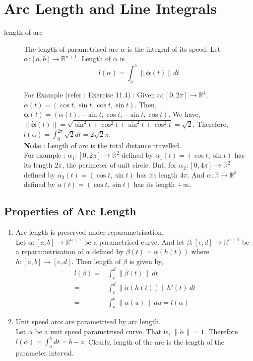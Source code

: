 \section{Arc Length and Line Integrals}
\begin{description}
	\item[length of arc] The length of parametrised arc $\alpha$ is the integral of its speed. Let $\alpha : [a,b] \to \mathbb{R}^{n+1}$. Length of $\alpha$ is
	\begin{equation}
		l(\alpha) = \int_a^b \| \dot{\boldsymbol{\alpha}}(t) \| dt
	\end{equation}

	For Example (refer : Exercise 11.4) : Given $\alpha: [0,2\pi] \to \mathbb{R}^4$, $\alpha(t) = (\cos t,\sin t, \cos t,\sin t)$. Then, $\dot{\boldsymbol{\alpha}}(t) = (\alpha(t),-\sin t,\cos t,-\sin t,\cos t)$. We have, $\| \dot{\boldsymbol{\alpha}}(t) \| = \sqrt{\sin^2 t+\cos^2 t+\sin^2 t+ \cos^2 t} = \sqrt{2}$. Therefore, $l(\alpha) = \int_0^{2\pi} \sqrt{2}dt = 2\sqrt{2}\pi$.\\

	\textbf{Note} : Length of arc is the total distance travelled.\\
	For example : $\alpha_1 : [0,2\pi] \to \mathbb{R}^2$ defined by $\alpha_1(t) = (\cos t,\sin t)$ has its length $2\pi$, the perimeter of unit circle. But, for $\alpha_2 : [0,4\pi] \to \mathbb{R}^2$ defined by $\alpha_2(t) = (\cos t,\sin t)$ has its length $4\pi$. And $\alpha : \mathbb{R} \to \mathbb{R}^2$ defined by $\alpha(t) = (\cos t,\sin t)$ has its length $+\infty$.
\end{description}

\subsection{Properties of Arc Length}
\begin{enumerate}
	\item Arc length is preserved under reparametrisation.\\
		Let $\alpha : [a,b] \to \mathbb{R}^{n+1}$ be a parametrised curve. And let $\beta : [c,d] \to \mathbb{R}^{n+1}$ be a reparametrisation of $\alpha$ defined by $\beta(t) = \alpha(h(t))$ where $h : [a,b] \to [c,d]$. Then length of $\beta$ is given by,
	\begin{align*}
		l(\beta) = & \int_c^d \| \dot{\beta}(t)\|\ dt \\
		= & \int_c^d \|\dot{\alpha}(h(t))\|h'(t)\ dt\\
		= & \int_a^b \|\alpha(u)\|\ du = l(\alpha)
	\end{align*}
	\item Unit speed arcs are parametrised by arc length.\\
		Let $\alpha$ be a unit speed parametrised curve. That is, $\|\dot{\alpha}\| = 1$. Therefore $l(\alpha) = \int_a^b dt = b-a$. Clearly, length of the arc is the length of the parameter interval.
\end{enumerate}

